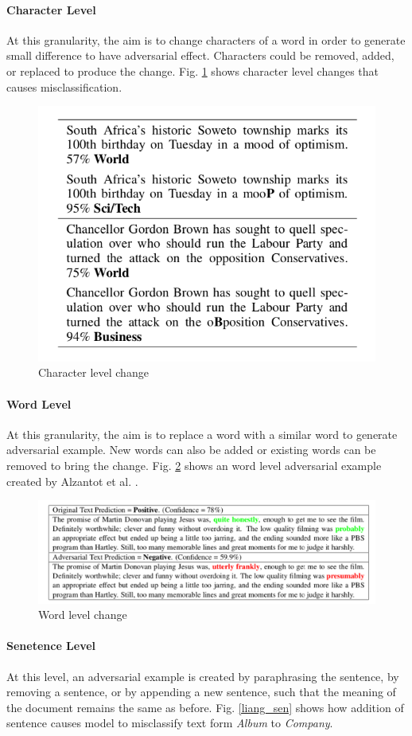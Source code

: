 \documentclass[12pt]{report}
\begin{document}
\begin{spacing}{1.5}
\paragraph{Character Level}
At this granularity, the aim is to change characters of a word in order to generate small difference to have adversarial effect. Characters could be removed, added, or replaced to produce the change.
Fig. \ref{ebrahimi_word} shows character level changes that causes misclassification.
\begin{figure}[!h]
  \centering
  \includegraphics[width=0.5\linewidth]{./img/ebrahimi_char.png}
  \caption{Character level change \cite{ebrahimi2018}}
  \label{ebrahimi_word}
\end{figure}

\paragraph{Word Level}
At this granularity, the aim is to replace a word with a similar word to generate adversarial example. New words can also be added or existing words can be removed to bring the change.
Fig. \ref{alzantot_senti} shows an word level adversarial example created by Alzantot et al. \cite{alzantot2018}.
\begin{figure}[!h]
  \includegraphics[width=\linewidth]{./img/alzantot_senti.png}
  \caption{Word level change \cite{alzantot2018}}
  \label{alzantot_senti}
\end{figure}

\paragraph{Senetence Level}
At this level, an adversarial example is created by paraphrasing the sentence, by removing a sentence, or by appending a new sentence, such that the meaning of the document remains the same as before.
Fig. \ref{liang_sen} shows how addition of sentence causes model to misclassify text form \textit{Album} to \textit{Company}.


\end{spacing}
\end{document}
